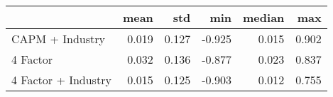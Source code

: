 \begin{tabular}{lrrrrr}
\toprule
{} &   mean &    std &    min &  median &    max \\
\midrule
 CAPM + Industry    &  0.019 &  0.127 & -0.925 &   0.015 &  0.902 \\
4 Factor            &  0.032 &  0.136 & -0.877 &   0.023 &  0.837 \\
4 Factor + Industry &  0.015 &  0.125 & -0.903 &   0.012 &  0.755 \\
\bottomrule
\end{tabular}
